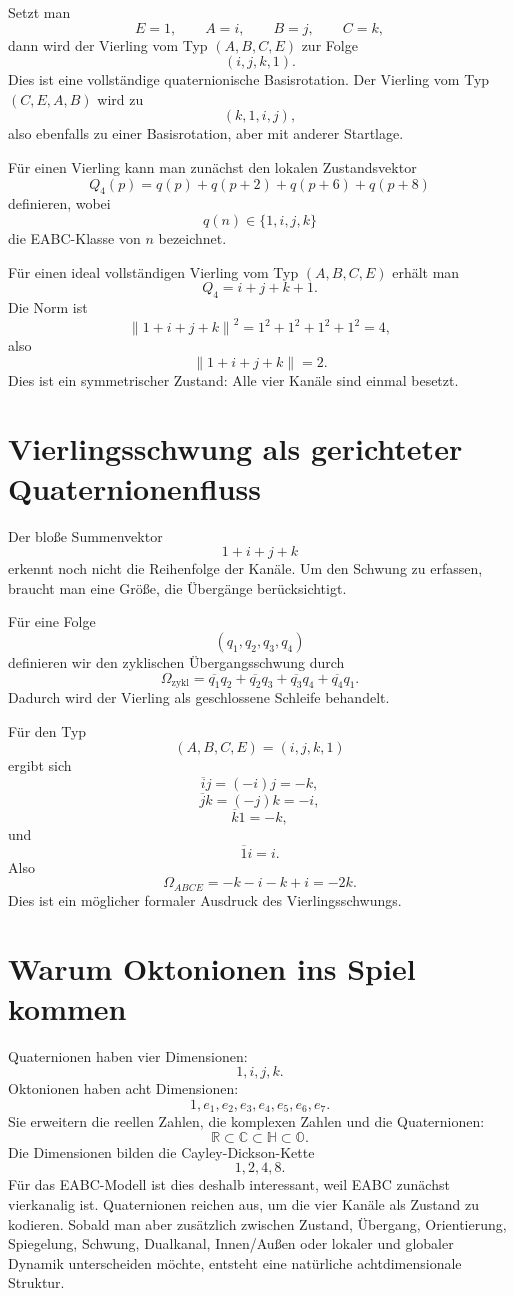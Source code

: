 \documentclass[11pt,a4paper]{article}
\theoremstyle{definition}
\theoremstyle{plain}
\newcommand{\R}{\mathbb{R}}
\newcommand{\C}{\mathbb{C}}
\newcommand{\HH}{\mathbb{H}}
\newcommand{\OO}{\mathbb{O}}
\newcommand{\norm}[1]{\left\lVert #1 \right\rVert}
\newcommand{\conj}[1]{\overline{#1}}
\begin{document}
	Setzt man
	\[
	E=1,
	\qquad
	A=i,
	\qquad
	B=j,
	\qquad
	C=k,
	\]
	dann wird der Vierling vom Typ $(A,B,C,E)$ zur Folge
	\[
	(i,j,k,1).
	\]
	Dies ist eine vollständige quaternionische Basisrotation. Der Vierling vom Typ $(C,E,A,B)$ wird zu
	\[
	(k,1,i,j),
	\]
	also ebenfalls zu einer Basisrotation, aber mit anderer Startlage.
	
	Für einen Vierling kann man zunächst den lokalen Zustandsvektor
	\[
	Q_4(p)=q(p)+q(p+2)+q(p+6)+q(p+8)
	\]
	definieren, wobei
	\[
	q(n)\in\{1,i,j,k\}
	\]
	die EABC-Klasse von $n$ bezeichnet.
	
	Für einen ideal vollständigen Vierling vom Typ $(A,B,C,E)$ erhält man
	\[
	Q_4=i+j+k+1.
	\]
	Die Norm ist
	\[
	\norm{1+i+j+k}^2=1^2+1^2+1^2+1^2=4,
	\]
	also
	\[
	\norm{1+i+j+k}=2.
	\]
	Dies ist ein symmetrischer Zustand: Alle vier Kanäle sind einmal besetzt.
	
	\section{Vierlingsschwung als gerichteter Quaternionenfluss}
	
	Der bloße Summenvektor
	\[
	1+i+j+k
	\]
	erkennt noch nicht die Reihenfolge der Kanäle. Um den Schwung zu erfassen, braucht man eine Größe, die Übergänge berücksichtigt.
	
	Für eine Folge
	\[
	(q_1,q_2,q_3,q_4)
	\]
	definieren wir den zyklischen Übergangsschwung durch
	\[
	\Omega_{\mathrm{zykl}}
	=
	\conj{q_1}q_2+
	\conj{q_2}q_3+
	\conj{q_3}q_4+
	\conj{q_4}q_1.
	\]
	Dadurch wird der Vierling als geschlossene Schleife behandelt.
	
	Für den Typ
	\[
	(A,B,C,E)=(i,j,k,1)
	\]
	ergibt sich
	\[
	\conj{i}j=(-i)j=-k,
	\]
	\[
	\conj{j}k=(-j)k=-i,
	\]
	\[
	\conj{k}1=-k,
	\]
	und
	\[
	\conj{1}i=i.
	\]
	Also
	\[
	\Omega_{ABCE}=-k-i-k+i=-2k.
	\]
	Dies ist ein möglicher formaler Ausdruck des Vierlingsschwungs.
	
	\section{Warum Oktonionen ins Spiel kommen}
	
	Quaternionen haben vier Dimensionen:
	\[
	1,i,j,k.
	\]
	Oktonionen haben acht Dimensionen:
	\[
	1,e_1,e_2,e_3,e_4,e_5,e_6,e_7.
	\]
	Sie erweitern die reellen Zahlen, die komplexen Zahlen und die Quaternionen:
	\[
	\R\subset\C\subset\HH\subset\OO.
	\]
	Die Dimensionen bilden die Cayley-Dickson-Kette
	\[
	1,2,4,8.
	\]
	Für das EABC-Modell ist dies deshalb interessant, weil EABC zunächst vierkanalig ist. Quaternionen reichen aus, um die vier Kanäle als Zustand zu kodieren. Sobald man aber zusätzlich zwischen Zustand, Übergang, Orientierung, Spiegelung, Schwung, Dualkanal, Innen/Außen oder lokaler und globaler Dynamik unterscheiden möchte, entsteht eine natürliche achtdimensionale Struktur.
	
\end{document}
